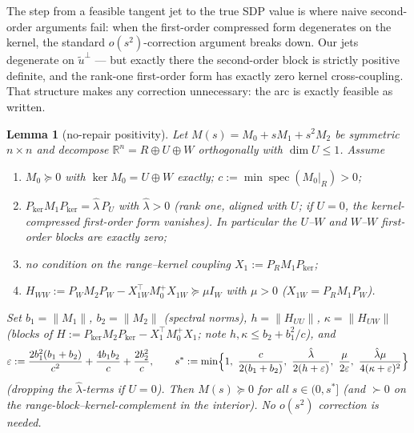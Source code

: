 \documentclass[11pt]{article}
\newtheorem{lemma}[theorem]{Lemma}
\newcommand{\eps}{\varepsilon}
\newcommand{\lam}{\lambda}
\begin{document}
The step from a feasible tangent jet to the true SDP value is where naive
second-order arguments fail: when the first-order compressed form
degenerates on the kernel, the standard $o(s^2)$-correction argument
breaks down. Our jets degenerate on $\tilde u^\perp$ --- but exactly there
the second-order block is strictly positive definite, and the rank-one
first-order form has exactly zero kernel cross-coupling. That structure
makes any correction unnecessary: the arc is exactly feasible as written.

\begin{lemma}[no-repair positivity]\label{lem:norepair}
Let $M(s)=M_0+sM_1+s^2M_2$ be symmetric $n\times n$ and decompose
$\mathbb R^n=R\oplus U\oplus W$ orthogonally with $\dim U\le1$. Assume
\begin{enumerate}
\item[(a)] $M_0\succeq0$ with $\ker M_0=U\oplus W$ exactly;
  $c:=\min\operatorname{spec}(M_0|_R)>0$;
\item[(b)] $P_{\ker}M_1P_{\ker}=\hat\lam\,P_U$ with $\hat\lam>0$
  (rank one, aligned with $U$; if $U=0$, the kernel-compressed first-order
  form vanishes). In particular the $U$--$W$ and $W$--$W$ first-order
  blocks are exactly zero;
\item[(c)] no condition on the range--kernel coupling
  $X_1:=P_RM_1P_{\ker}$;
\item[(d)] $H_{WW}:=P_WM_2P_W-X_{1W}^\top M_0^{+}X_{1W}\succeq\mu I_W$
  with $\mu>0$ ($X_{1W}=P_RM_1P_W$).
\end{enumerate}
Set $b_1=\|M_1\|$, $b_2=\|M_2\|$ (spectral norms), $h=\|H_{UU}\|$,
$\kappa=\|H_{UW}\|$ (blocks of
$H:=P_{\ker}M_2P_{\ker}-X_1^\top M_0^{+}X_1$; note
$h,\kappa\le b_2+b_1^2/c$), and
\[
\eps:=\frac{2b_1^2(b_1+b_2)}{c^2}+\frac{4b_1b_2}{c}+\frac{2b_2^2}{c},
\qquad
s^\ast:=\min\Bigl\{1,\ \frac c{2(b_1+b_2)},\ \frac{\hat\lam}{2(h+\eps)},\
\frac\mu{2\eps},\ \frac{\hat\lam\mu}{4(\kappa+\eps)^2}\Bigr\}
\]
(dropping the $\hat\lam$-terms if $U=0$). Then $M(s)\succeq0$ for all
$s\in(0,s^\ast]$ (and $\succ0$ on the range-block--kernel-complement in
the interior). No $o(s^2)$ correction is needed.
\end{lemma}
\end{document}
